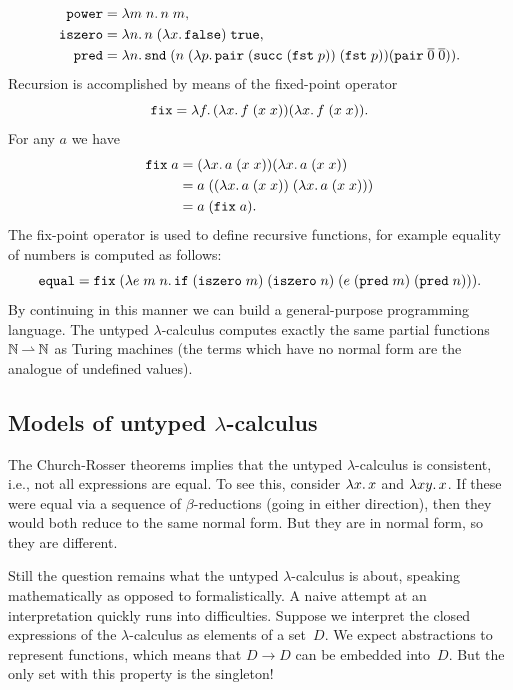 %
\begin{align*}
  \mathtt{power} &= \lambda m\;n .\,n\;m,\\
  \mathtt{iszero} &= \lambda n .\,n\; (\lambda x .\,\mathtt{false})\; \mathtt{true},\\
  \mathtt{pred} &=
    \lambda n .\,
      \mathtt{snd}\; (n\; (\lambda p .\,
        \mathtt{pair}\; (\mathtt{succ}\; (\mathtt{fst}\; p))\;
        (\mathtt{fst}\; p))
      (\mathtt{pair}\; \overline{0}\; \overline{0})).
\end{align*}
%
Recursion is accomplished by means of the fixed-point operator
%
\begin{equation*}
  \mathtt{fix} = \lambda f .\,(\lambda x .\,f\;(x\;x)) (\lambda x .\,f\;(x\;x)).
\end{equation*}
%
For any $a$ we have
%
\begin{align*}
  \mathtt{fix}\;a &=
  (\lambda x .\,a\;(x\;x)) (\lambda x .\,a\;(x\;x)) \\
  &= a\;((\lambda x .\,a\;(x\;x))\;(\lambda x .\,a\;(x\;x))) \\
  &= a\;(\mathtt{fix}\;a).
\end{align*}
%
The fix-point operator is used to define recursive functions, for
example equality of numbers is computed as follows:
%
\begin{equation*}
  \mathtt{equal} = \mathtt{fix}\;(\lambda e\;m\;n .\,
    \mathtt{if}\;
    (\mathtt{iszero}\;m)\;
    (\mathtt{iszero}\;n)\;
    (e\;(\mathtt{pred}\;m)\;(\mathtt{pred}\;n))).
\end{equation*}
%
By continuing in this manner we can build a general-purpose
programming language. The untyped $\lambda$-calculus computes exactly
the same partial functions $\mathbb{N} \mathbin{\rightharpoonup} \mathbb{N}$ as Turing machines (the
terms which have no normal form are the analogue of undefined values).


\subsection{Models of untyped $\lambda$-calculus}
\label{sec:models-untyped-lambda-calculus}

The Church-Rosser theorems implies that the untyped $\lambda$-calculus
is consistent, i.e., not all expressions are equal. To see this,
consider $\lambda x .\,x$ and $\lambda x y .\,x$. If these were equal via
a sequence of $\beta$-reductions (going in either direction), then
they would both reduce to the same normal form. But they are in normal
form, so they are different.

Still the question remains what the untyped $\lambda$-calculus is
about, speaking mathematically as opposed to formalistically. A naive
attempt at an interpretation quickly runs into difficulties. Suppose
we interpret the closed expressions of the $\lambda$-calculus as
elements of a set~$D$. We expect abstractions to represent functions,
which means that $D \to D$ can be embedded into~$D$. But the only set
with this property is the singleton!

